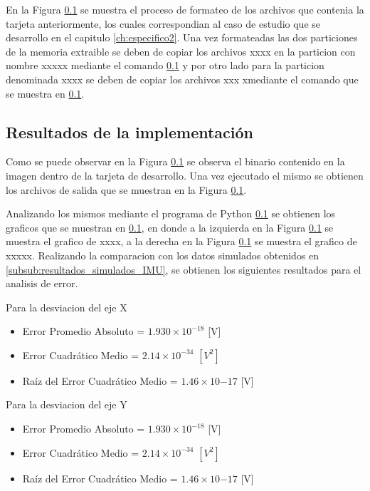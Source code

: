 En la Figura \ref{} se muestra el proceso de formateo de los archivos que contenia la tarjeta anteriormente, los cuales correspondian al caso de estudio que se desarrollo en el capitulo \ref{ch:especifico2}. Una vez formateadas las dos particiones de la memoria extraible se deben de copiar los archivos xxxx en la particion con nombre xxxxx mediante el comando \ref{} y por otro lado para la particion denominada xxxx se deben de copiar los archivos xxx xmediante el comando que se muestra en \ref{}. 



\subsection{Resultados de la implementación}

Como se puede observar en la Figura \ref{} se observa el binario contenido en la imagen dentro de la tarjeta de desarrollo. Una vez ejecutado el mismo se obtienen los archivos de salida que se muestran en la Figura \ref{}. 


Analizando los mismos mediante el programa de Python \ref{} se obtienen los graficos que se muestran en \ref{}, en donde a la izquierda en la Figura \ref{} se muestra el grafico de xxxx, a la derecha en la Figura \ref{} se muestra el grafico de xxxxx. Realizando la comparacion con los datos simulados obtenidos en \ref{subsub:resultados_simulados_IMU}, se obtienen los siguientes resultados para el analisis de error.

Para la desviacion del eje X


\begin{itemize}
    \item Error Promedio Absoluto = $1.930 \times 10^{-18}$ [V]
    \item Error Cuadrático Medio = $2.14 \times 10^{-34}$ $[V^{2}]$
    \item Raíz del Error Cuadrático Medio = $1.46 \times 10{-17}$ [V]
\end{itemize}

Para la desviacion del eje Y


\begin{itemize}
    \item Error Promedio Absoluto = $1.930 \times 10^{-18}$ [V]
    \item Error Cuadrático Medio = $2.14 \times 10^{-34}$ $[V^{2}]$
    \item Raíz del Error Cuadrático Medio = $1.46 \times 10{-17}$ [V]
\end{itemize}


